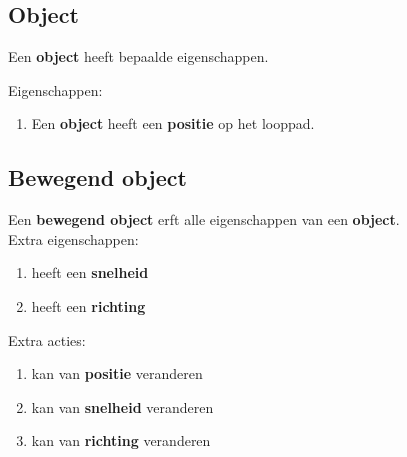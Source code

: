 

\subsection{Object}
Een \textbf{object} heeft bepaalde eigenschappen.

Eigenschappen:
\begin{enumerate}
\item Een \textbf{object} heeft een \textbf{positie} op het looppad.
\end{enumerate}


\subsection{Bewegend object}
Een \textbf{bewegend object} erft alle eigenschappen van een \textbf{object}. \\
Extra eigenschappen:
\begin{enumerate}
  \item heeft een \textbf{snelheid}
  \item heeft een \textbf{richting}
\end{enumerate}
Extra acties:
\begin{enumerate}
  \item kan van \textbf{positie} veranderen
  \item kan van \textbf{snelheid} veranderen
  \item kan van \textbf{richting} veranderen
\end{enumerate}

